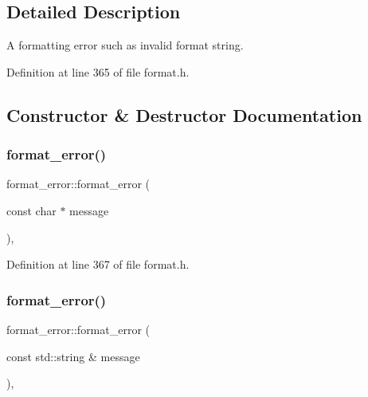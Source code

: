 \subsection{Detailed Description}
A formatting error such as invalid format string. 

Definition at line 365 of file format.\+h.



\subsection{Constructor \& Destructor Documentation}
\mbox{\label{classformat__error_adfdc5b92749dc5f436e456bb5393d689}} 
\subsubsection{\texorpdfstring{format\+\_\+error()}{format\_error()}\hspace{0.1cm}{\footnotesize\ttfamily [1/2]}}
{\footnotesize\ttfamily format\+\_\+error\+::format\+\_\+error (\begin{DoxyParamCaption}\item[{const char $\ast$}]{message }\end{DoxyParamCaption})\hspace{0.3cm}{\ttfamily [inline]}, {\ttfamily [explicit]}}



Definition at line 367 of file format.\+h.

\mbox{\label{classformat__error_aec9d9c4e34320e130463abaf4dc4f200}} 
\subsubsection{\texorpdfstring{format\+\_\+error()}{format\_error()}\hspace{0.1cm}{\footnotesize\ttfamily [2/2]}}
{\footnotesize\ttfamily format\+\_\+error\+::format\+\_\+error (\begin{DoxyParamCaption}\item[{const std\+::string \&}]{message }\end{DoxyParamCaption})\hspace{0.3cm}{\ttfamily [inline]}, {\ttfamily [explicit]}}



